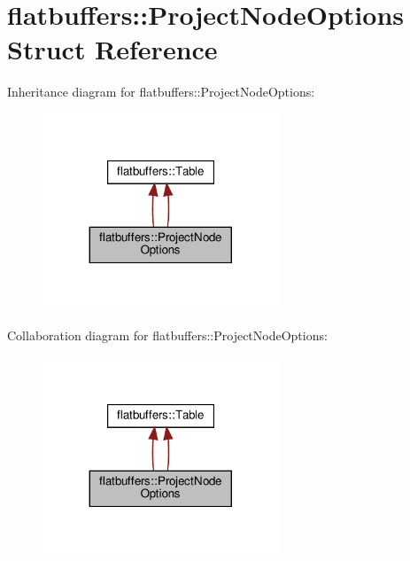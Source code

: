 \hypertarget{structflatbuffers_1_1ProjectNodeOptions}{}\section{flatbuffers\+:\+:Project\+Node\+Options Struct Reference}
\label{structflatbuffers_1_1ProjectNodeOptions}


Inheritance diagram for flatbuffers\+:\+:Project\+Node\+Options\+:
\nopagebreak
\begin{figure}[H]
\begin{center}
\leavevmode
\includegraphics[width=200pt]{structflatbuffers_1_1ProjectNodeOptions__inherit__graph}
\end{center}
\end{figure}


Collaboration diagram for flatbuffers\+:\+:Project\+Node\+Options\+:
\nopagebreak
\begin{figure}[H]
\begin{center}
\leavevmode
\includegraphics[width=200pt]{structflatbuffers_1_1ProjectNodeOptions__coll__graph}
\end{center}
\end{figure}
